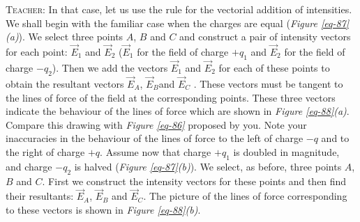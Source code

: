 \documentclass[a4paper,sfsidenotes]{tufte-book}
\begin{document}
\textsc{Teacher:} In that case, let us use the rule for the vectorial addition of intensities. We shall begin with the familiar case when the charges are equal (\emph{Figure \ref{eq-87}(a)}). We select three points $A$, $B$ and $C$ and construct a pair of intensity vectors for each point: $\vec{E}_{1}$ and $\vec{E}_{2}$ ($\vec{E}_{1}$ for the field of charge $+q_{1}$ and $\vec{E}_{2}$ for the field of charge $-q_{2}$). Then we add the vectors $\vec{E}_{1}$ and $\vec{E}_{2}$ for each of these points to obtain the resultant vectors $\vec{E}_{A}$, $\vec{E}_{B}$and $\vec{E}_{C}$ . These vectors must be tangent to the lines of force of the field at the corresponding points. These three vectors indicate the behaviour of the lines of force which are shown in \emph{Figure \ref{eq-88}(a)}. Compare this drawing with \emph{Figure \ref{eq-86}} proposed by you. Note your inaccuracies in the behaviour of the lines of force to the left of charge $-q$ and to the right of charge $+q$. Assume now that charge $+q_{1}$ is doubled in magnitude, and charge $-q_{2}$ is halved (\emph{Figure \ref{eq-87}(b)}). We select, as before, three points $A$, $B$ and $C$. First we construct the intensity vectors for these points and then find their resultants: $\vec{E}_{A}$, $\vec{E}_{B}$ and $\vec{E}_{C}$. The picture of the lines of force corresponding to these vectors is shown in \emph{Figure \ref{eq-88}(b)}.
\end{document}
